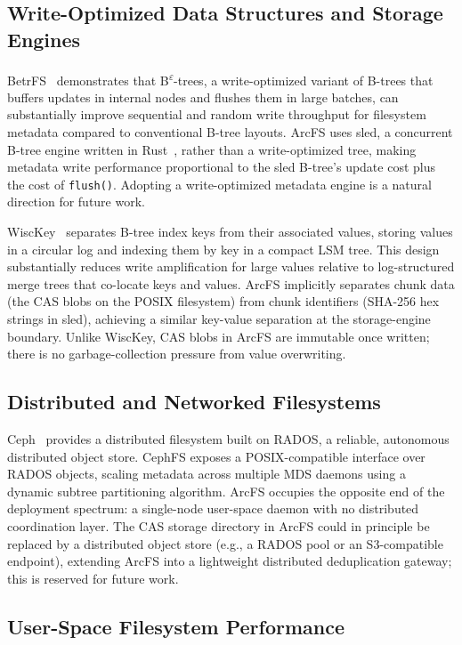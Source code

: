 \documentclass[journal]{IEEEtran}
\begin{document}
\subsection{Write-Optimized Data Structures and Storage Engines}

BetrFS~\cite{jannen2015betrfs} demonstrates that B\textsuperscript{$\varepsilon$}-trees,
a write-optimized variant of B-trees that buffers updates in internal nodes
and flushes them in large batches, can substantially improve sequential and
random write throughput for filesystem metadata compared to conventional
B-tree layouts.  ArcFS uses sled, a concurrent B-tree engine written in
Rust~\cite{sled2024}, rather than a write-optimized tree, making metadata
write performance proportional to the sled B-tree's update cost plus the
cost of \texttt{flush()}.  Adopting a write-optimized metadata engine is a
natural direction for future work.

WiscKey~\cite{lu2017wisckey} separates B-tree index keys from their
associated values, storing values in a circular log and indexing them by
key in a compact LSM tree. This design substantially reduces write
amplification for large values relative to log-structured merge trees that
co-locate keys and values. ArcFS implicitly separates chunk data (the
CAS blobs on the POSIX filesystem) from chunk identifiers (SHA-256 hex
strings in sled), achieving a similar key-value separation at the
storage-engine boundary. Unlike WiscKey, CAS blobs in ArcFS are immutable
once written; there is no garbage-collection pressure from value overwriting.

\subsection{Distributed and Networked Filesystems}

Ceph~\cite{weil2006ceph} provides a distributed filesystem built on RADOS,
a reliable, autonomous distributed object store. CephFS exposes a
POSIX-compatible interface over RADOS objects, scaling metadata across
multiple MDS daemons using a dynamic subtree partitioning algorithm.
ArcFS occupies the opposite end of the deployment spectrum: a single-node
user-space daemon with no distributed coordination layer.  The CAS storage
directory in ArcFS could in principle be replaced by a distributed
object store (e.g., a RADOS pool or an S3-compatible endpoint), extending
ArcFS into a lightweight distributed deduplication gateway; this is
reserved for future work.

\subsection{User-Space Filesystem Performance}
\end{document}
